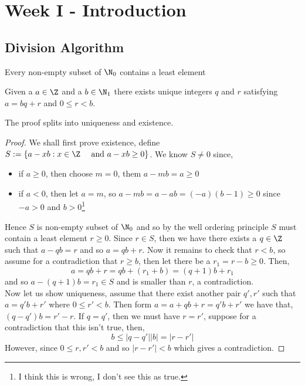 
\section{Week I - Introduction}

\subsection{Division Algorithm}

\begin{ndefi}
  Every non-empty subset of $\N_0$ contains a least element
\end{ndefi}

\begin{nthm}
  Given a $a\in\Z$ and a $b\in\N_1$ there exists unique integers $q$ and $r$ satisfying $a = bq + r$ and $0\le r < b$.
\end{nthm}
The proof splits into uniqueness and existence.

\begin{proof}
  We shall first prove existence, define $S := \{a - xb : x \in \Z \quad \text{ and } a - xb \ge 0 \}$. We know $S \ne 0$ since,
  \begin{itemize}
    \item if $a \ge 0$, then choose $m = 0$, them $a - mb = a \ge 0$
    \item if $a < 0$, then let $a = m$, so $a - mb = a - ab = (-a)(b-1) \ge 0$ since $-a>0$ and $b > 0$\footnote{I think this is wrong, I don't see this as true.}
  \end{itemize}
  Hence $S$ is non-empty subset of $\N_0$ and so by the well ordering principle $S$ must contain a least element $r \ge 0$. Since $r \in S$, then we have there exists a $q \in\Z$ such that $a - qb = r$ and so $a = qb + r$. Now it remains to check that $r < b$, so assume for a contradiction that $r \ge b$, then let there be a $r_1 = r -b \ge 0$. Then,
  $$ a = qb + r = qb + (r_1 + b) = (q+1)b + r_1 $$
  and so $a - (q+1) b = r_1 \in S$ and is smaller than $r$, a contradiction.\\

  Now let us show uniqueness, assume that there exist another pair $q', r'$ such that $a = q'b+r'$ where $0 \le r' < b$. Then form $a = a + qb + r = q'b + r'$ we have that, $(q - q')b = r' - r$. If $q = q'$, then we must have $r = r'$, suppose for a contradiction that this isn't true, then,
  $$ b \le |q - q'||b| = |r - r'| $$
  However, since $0 \le r, r' < b$ and so $|r - r'| < b$ which gives a contradiction.
\end{proof}

